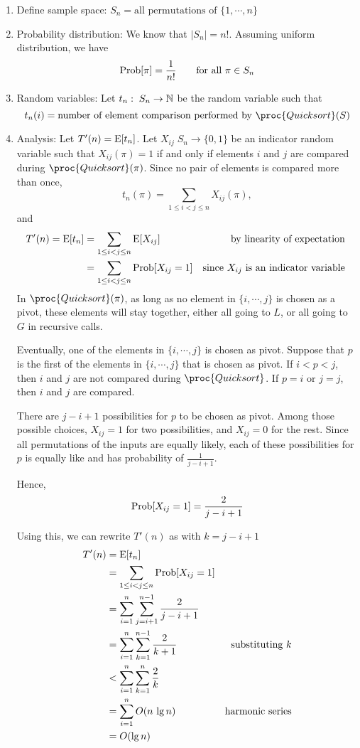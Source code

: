 \begin{enumerate}
    \item Define sample space: $S_n = \text{all permutations of $\{1,\cdots,n\}$}$
    \item Probability distribution: We know that $\left| S_n \right| = n!$. Assuming uniform distribution, we have
    $$
    \mathrm{Prob}[\pi] = \frac{1}{n!} \qquad \text{for all $\pi \in S_n$}
    $$
    \item Random variables: Let $t_n: \; S_n \to \mathbb{N}$ be the random variable such that
    $$
    t_n(i) = \text{number of element comparison performed by $\proc{Quicksort}(S)$}
    $$
    \item Analysis: Let $T'(n) = \mathrm{E}[t_n]$. Let $X_{ij} \; S_n \to \{0,1\}$ be an indicator random variable such that $X_{ij}(\pi) = 1$ if and only if elements $i$ and $j$ are compared during $\proc{Quicksort}(\pi)$. Since no pair of elements is compared more than once,
    $$
    t_n(\pi) = \sum_{1 \leq i < j \leq n} X_{ij}(\pi),
    $$
    and
    $$
    \begin{aligned}
        T'(n) = \mathrm{E}[t_n] &= \sum_{1 \leq i < j \leq n} \mathrm{E}[X_{ij}] & {\text{by linearity of expectation }} \\
        &= \sum_{1 \leq i < j \leq n} \mathrm{Prob}[X_{ij} = 1] & {\text{since $X_{ij}$ is an indicator variable }}
    \end{aligned}
    $$
    In $\proc{Quicksort}(\pi)$, as long as no element in $\{i, \cdots, j\}$ is chosen as a pivot, these elements will stay together, either all going to $L$, or all going to $G$ in recursive calls. 

    Eventually, one of the elements in $\{i, \cdots, j\}$ is chosen as pivot. Suppose that $p$ is the first of the elements in $\{ i, \cdots, j \}$ that is chosen as pivot. If $i < p < j$, then $i$ and $j$ are not compared during $\proc{Quicksort}$. If $p=i$ or $j=j$, then $i$ and $j$ are compared.
    
    There are $j-i+1$ possibilities for $p$ to be chosen as pivot. Among those possible choices, $X_{ij} = 1$ for two possibilities, and $X_{ij} = 0$ for the rest. Since all permutations of the inputs are equally likely, each of these possibilities for $p$ is equally like and has probability of $\displaystyle \frac{1}{j-i+1}$.

    Hence,
    $$
    \mathrm{Prob}[X_{ij} = 1] = \frac{2}{j-i+1}
    $$

    Using this, we can rewrite $T'(n)$ as with $k = j-i+1$ 
    $$
    \begin{aligned}
        T'(n) &= \mathrm{E}[t_n] \\
        &= \sum_{1 \leq i < j \leq n} \mathrm{Prob}[X_{ij} = 1] \\
        &= \sum_{i=1}^n \sum_{j=i+1}^{n-1} \frac{2}{j-i+1} \\
        &= \sum_{i=1}^n \sum_{k=1}^{n-1} \frac{2}{k+1} & \text{substituting $k$} \\
        &< \sum_{i=1}^n \sum_{k=1}^n \frac{2}{k} \\
        &= \sum_{i=1}^n O(n\, \lg n) & \text{harmonic series} \\
        &= O(\lg n)
    \end{aligned}
    $$


\end{enumerate}
